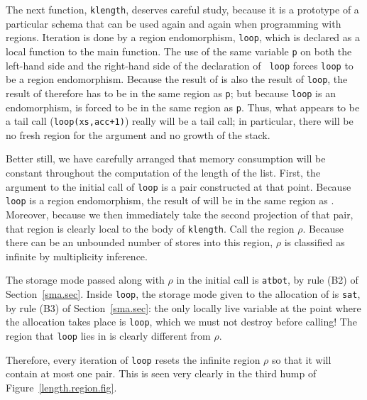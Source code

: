 \documentclass[12pt]{book}
\begin{document}
The next function, {\tt klength}, deserves careful study, because
it is a prototype of a particular schema
that can be used again and again when programming with
regions. Iteration is done by a 
%
region endomorphism, {\tt loop}, which is declared as a local function
to the main function. The use of the same variable {\tt p} on both the
left-hand side and the right-hand side of the declaration of {\tt
  loop} forces {\tt loop} to be a region endomorphism. Because the
result of  is also the result of {\tt loop}, the
result of  therefore has to be in the same
region as {\tt p}; but because {\tt loop} is an endomorphism,
 is forced to be in the same region as {\tt p}.
Thus, what appears to be a tail call ({\tt loop(xs,acc+1)}) really
will be a tail call; in particular, there will be no fresh region for
the argument and no growth of the stack.

Better still, we have carefully arranged that
memory consumption will be constant throughout the computation of
the length of the list. First, the argument to the 
initial call of {\tt loop} is a pair  constructed
at that point. Because {\tt loop} is a region endomorphism, the
result of  will be in the same region as .
Moreover, because we then immediately take the second projection of
that pair, that region is clearly local to the body of {\tt klength}.
Call the region  $\rho$. Because there can be an unbounded number of stores into
this region, $\rho$ is classified as infinite by multiplicity inference.

The storage mode passed along with $\rho$ in the initial call
 is {\tt atbot}, by rule (B2) of
Section~\ref{sma.sec}. Inside {\tt loop}, the storage mode given to
the allocation of  is {\tt sat}, by rule (B3) of
Section~\ref{sma.sec}: the only locally live variable at the point
where the allocation takes place is {\tt loop}, which we must not
destroy before calling! The region that {\tt loop} lies in is
clearly different from $\rho$.

Therefore, every iteration of {\tt loop} resets the infinite region
$\rho$ so that it will contain at most one pair.  This is seen very
clearly in the third hump of Figure~\ref{length.region.fig}.
\end{document}
